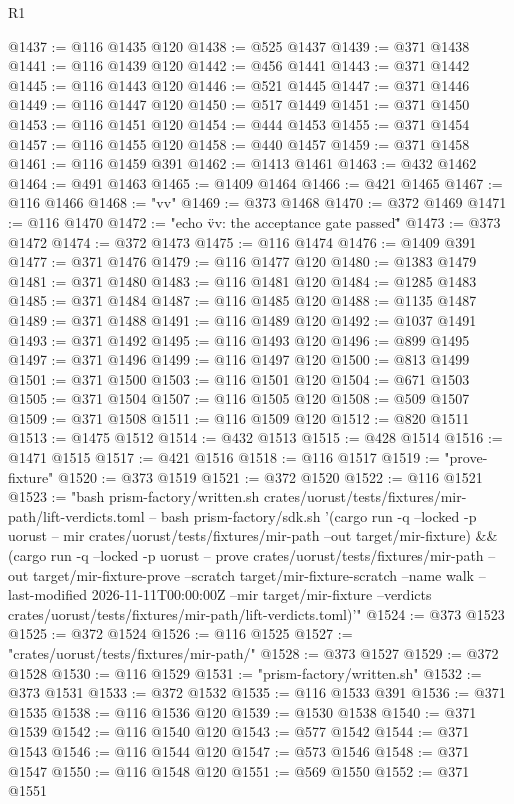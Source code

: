 \begin{lexlean}{R1}
\begin{coremodule}
@1437 := @116 @1435 @120
@1438 := @525 @1437
@1439 := @371 @1438
@1441 := @116 @1439 @120
@1442 := @456 @1441
@1443 := @371 @1442
@1445 := @116 @1443 @120
@1446 := @521 @1445
@1447 := @371 @1446
@1449 := @116 @1447 @120
@1450 := @517 @1449
@1451 := @371 @1450
@1453 := @116 @1451 @120
@1454 := @444 @1453
@1455 := @371 @1454
@1457 := @116 @1455 @120
@1458 := @440 @1457
@1459 := @371 @1458
@1461 := @116 @1459 @391
@1462 := @1413 @1461
@1463 := @432 @1462
@1464 := @491 @1463
@1465 := @1409 @1464
@1466 := @421 @1465
@1467 := @116 @1466
@1468 := "vv"
@1469 := @373 @1468
@1470 := @372 @1469
@1471 := @116 @1470
@1472 := "echo \"vv: the acceptance gate passed\""
@1473 := @373 @1472
@1474 := @372 @1473
@1475 := @116 @1474
@1476 := @1409 @391
@1477 := @371 @1476
@1479 := @116 @1477 @120
@1480 := @1383 @1479
@1481 := @371 @1480
@1483 := @116 @1481 @120
@1484 := @1285 @1483
@1485 := @371 @1484
@1487 := @116 @1485 @120
@1488 := @1135 @1487
@1489 := @371 @1488
@1491 := @116 @1489 @120
@1492 := @1037 @1491
@1493 := @371 @1492
@1495 := @116 @1493 @120
@1496 := @899 @1495
@1497 := @371 @1496
@1499 := @116 @1497 @120
@1500 := @813 @1499
@1501 := @371 @1500
@1503 := @116 @1501 @120
@1504 := @671 @1503
@1505 := @371 @1504
@1507 := @116 @1505 @120
@1508 := @509 @1507
@1509 := @371 @1508
@1511 := @116 @1509 @120
@1512 := @820 @1511
@1513 := @1475 @1512
@1514 := @432 @1513
@1515 := @428 @1514
@1516 := @1471 @1515
@1517 := @421 @1516
@1518 := @116 @1517
@1519 := "prove-fixture"
@1520 := @373 @1519
@1521 := @372 @1520
@1522 := @116 @1521
@1523 := "bash prism-factory/written.sh crates/uorust/tests/fixtures/mir-path/lift-verdicts.toml -- bash prism-factory/sdk.sh '(cargo run -q --locked -p uorust -- mir crates/uorust/tests/fixtures/mir-path --out target/mir-fixture) && (cargo run -q --locked -p uorust -- prove crates/uorust/tests/fixtures/mir-path --out target/mir-fixture-prove --scratch target/mir-fixture-scratch --name walk --last-modified 2026-11-11T00:00:00Z --mir target/mir-fixture --verdicts crates/uorust/tests/fixtures/mir-path/lift-verdicts.toml)'"
@1524 := @373 @1523
@1525 := @372 @1524
@1526 := @116 @1525
@1527 := "crates/uorust/tests/fixtures/mir-path/"
@1528 := @373 @1527
@1529 := @372 @1528
@1530 := @116 @1529
@1531 := "prism-factory/written.sh"
@1532 := @373 @1531
@1533 := @372 @1532
@1535 := @116 @1533 @391
@1536 := @371 @1535
@1538 := @116 @1536 @120
@1539 := @1530 @1538
@1540 := @371 @1539
@1542 := @116 @1540 @120
@1543 := @577 @1542
@1544 := @371 @1543
@1546 := @116 @1544 @120
@1547 := @573 @1546
@1548 := @371 @1547
@1550 := @116 @1548 @120
@1551 := @569 @1550
@1552 := @371 @1551

\end{coremodule}
\end{lexlean}
